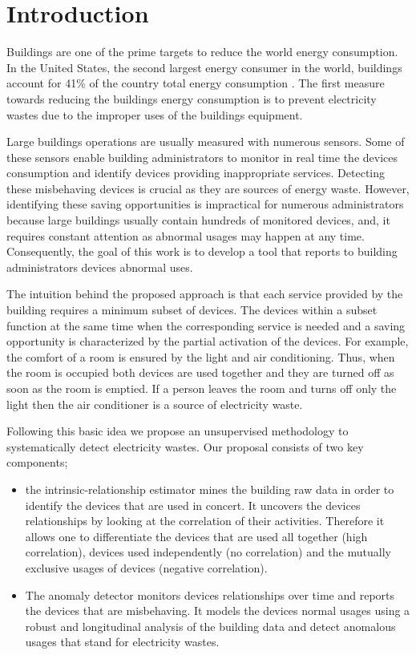 \section{Introduction}
Buildings are one of the prime targets to reduce the world energy consumption.
In the United States, the second largest energy consumer in the world, buildings account for 41\% of the country total energy consumption \cite{aer2011}.
The first measure towards reducing the buildings energy consumption is to prevent electricity wastes due to the improper uses of the buildings equipment.

Large buildings operations are usually measured with numerous sensors.
Some of these sensors enable building administrators to monitor in real time the devices consumption and identify devices providing inappropriate services.
Detecting these misbehaving devices is crucial as they are sources of energy waste.
However, identifying these saving opportunities is impractical for numerous administrators because large buildings usually contain hundreds of monitored devices, and, it requires constant attention as abnormal usages may happen at any time.
Consequently, the goal of this work is to develop a tool that reports to building administrators devices abnormal uses.

The intuition behind the proposed approach is that each service provided by the building requires a minimum subset of devices.
The devices within a subset function at the same time when the corresponding service is needed and a saving opportunity is characterized by the partial activation of the devices.
For example, the comfort of a room is ensured by the light and air conditioning.
Thus, when the room is occupied both devices are used together and they are turned off as soon as the room is emptied.
If a person leaves the room and turns off only the light then the air conditioner is a source of electricity waste.

Following this basic idea we propose an unsupervised methodology to systematically detect electricity wastes.
Our proposal consists of two key components;
\begin{itemize}
 \item the intrinsic-relationship estimator mines the building raw data in order to identify the devices that are used in concert.
 It uncovers the devices relationships by looking at the correlation of their activities. 
 Therefore it allows one to differentiate the devices that are used all together (high correlation), devices used independently (no correlation) and the mutually exclusive usages of devices (negative correlation).
 \item The anomaly detector monitors devices relationships over time and reports the devices that are misbehaving.
 It models the devices normal usages using a robust and longitudinal analysis of the building data and detect anomalous usages that stand for electricity wastes.
\end{itemize}



